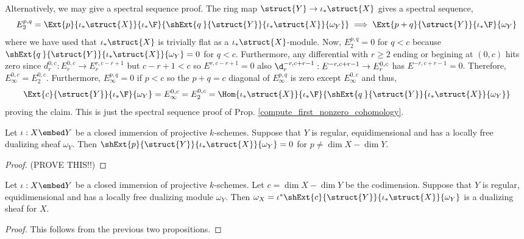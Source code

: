 \documentclass[12pt]{article}
\begin{document}
\begin{rmk}
Alternatively, we may give a spectral sequence proof. The ring map $\struct{Y} \to \iota_* \struct{X}$ gives a spectral sequence,
\[ E^{p, q}_2 = \Ext{p}{\iota_* \struct{X}}{\iota_* \F}{\shExt{q \:}{\struct{Y}}{\iota_* \struct{X}}{\omega_Y}} \implies \Ext{p+q}{\struct{Y}}{\iota_* \F}{\omega_Y} \]
where we have used that $\iota_* \struct{X}$ is trivially flat as a $\iota_* \struct{X}$-module. Now, $E^{p,q}_2 = 0$ for $q < c$ because $\shExt{q \:}{\struct{Y}}{\iota_* \struct{X}}{\omega_Y} = 0$ for $q < c$. Furthermore, any differential with $r \ge 2$ ending or begining at $(0, c)$ hits zero since $d^{0,c}_r : E^{0,c}_r \to E^{r, c - r + 1}_r$ but $c - r + 1 < c$ so $E^{r, c - r + 1} = 0$ also $\d^{-r,c+r-1}_r : E^{-r, c + r - 1} \to E^{0, c}_r$ has $E^{-r, c + r - 1} = 0$. Therefore, $E^{0, c}_\infty = E^{0, c}_2$. Furthermore, $E^{p,q}_\infty = 0$ if $p < c$ so the $p + q = c$ diagonal of $E^{p,q}_\infty$ is zero except $E^{0,c}_\infty$ and thus,
\[ \Ext{c}{\struct{Y}}{\iota_* \F}{\omega_Y} = E^{0, c}_\infty = E^{0,c}_2 = \Hom{\iota_* \struct{X}}{\iota_* \F}{\shExt{q\:}{\struct{Y}}{\iota_* \struct{X}}{\omega_Y}} \]
proving the claim. This is just the spectral sequence proof of Prop. \ref{compute_first_nonzero_cohomology}. 
\end{rmk}

\begin{lemma} \label{ext_vanshing_regular}
Let $\iota : X \embed Y$ be a closed immersion of projective $k$-schemes. Suppose that $Y$ is regular, equidimensional and has a locally free dualizing sheaf $\omega_Y$. Then $\shExt{p}{\struct{Y}}{\iota_* \struct{X}}{\omega_Y} = 0$ for $p \neq \dim{X} - \dim{Y}$.
\end{lemma}

\begin{proof}
(PROVE THIS!!)
\end{proof}

\begin{prop}
Let $\iota : X \embed Y$ be a closed immersion of projective $k$-schemes. Let $c = \dim{X} - \dim{Y}$ be the codimension. Suppose that $Y$ is regular, equidimensional and has a locally free dualizing module $\omega_Y$. Then $\omega_X = \iota^* \shExt{c}{\struct{Y}}{\iota_* \struct{X}}{\omega_Y}$ is a dualizing sheaf for $X$. 
\end{prop}

\begin{proof}
This follows from the previous two propositions.
\end{proof}
\end{document}
